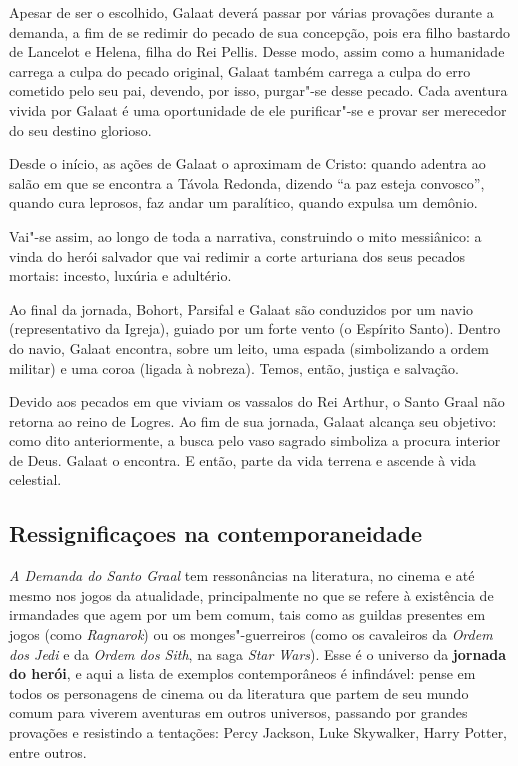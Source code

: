 \documentclass[11pt]{extarticle}
\begin{document}
Apesar de ser o escolhido, Galaat deverá passar por várias
provações durante a demanda, a fim de se redimir do pecado de sua
concepção, pois era filho bastardo de Lancelot e Helena, filha do Rei
Pellis. Desse modo, assim como a humanidade carrega a culpa do pecado
original, Galaat também carrega a culpa do erro cometido pelo seu pai,
devendo, por isso, purgar"-se desse pecado. Cada aventura vivida por
Galaat é uma oportunidade de ele purificar"-se e provar ser merecedor do
seu destino glorioso.

Desde o início, as ações de Galaat o aproximam de Cristo:
quando adentra ao salão em que se encontra a Távola Redonda, dizendo ``a
paz esteja convosco'', quando cura leprosos, faz andar um paralítico,
quando expulsa um demônio.

Vai"-se assim, ao longo de toda a narrativa, construindo o mito
messiânico: a vinda do herói salvador que vai redimir a corte arturiana
dos seus pecados mortais: incesto, luxúria e
adultério.

Ao final da jornada, Bohort, Parsifal e Galaat são conduzidos
por um navio (representativo da Igreja), guiado por um forte vento (o
Espírito Santo). Dentro do navio, Galaat encontra, sobre um leito, uma
espada (simbolizando a ordem militar) e uma coroa (ligada à nobreza).
Temos, então, justiça e
salvação.

Devido aos pecados em que viviam os vassalos do Rei Arthur, o
Santo Graal não retorna ao reino de Logres. Ao fim de sua jornada,
Galaat alcança seu objetivo: como dito anteriormente, a busca pelo vaso
sagrado simboliza a procura interior de Deus. Galaat o encontra. E
então, parte da vida terrena e ascende à vida
celestial.

\subsection{Ressignificaçoes na contemporaneidade}

\emph{A Demanda do Santo Graal} tem ressonâncias na literatura, no
cinema e até mesmo nos jogos da atualidade, principalmente no que se
refere à existência de irmandades que agem por um bem comum, tais como
as guildas presentes em jogos (como \emph{Ragnarok}) ou os
monges"-guerreiros (como os cavaleiros da \emph{Ordem dos Jedi} e da
\emph{Ordem dos Sith}, na saga \emph{Star Wars}). Esse é o universo da
\textbf{jornada do herói}, e aqui a lista de exemplos contemporâneos é
infindável: pense em todos os personagens de cinema ou da literatura que
partem de seu mundo comum para viverem aventuras em outros universos,
passando por grandes provações e resistindo a tentações: Percy Jackson,
Luke Skywalker, Harry Potter, entre outros.
\end{document}
